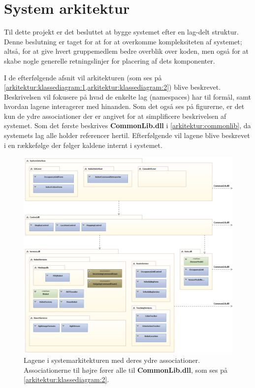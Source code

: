 \section{System arkitektur}\label{arkitektur}
Til dette projekt er det besluttet at bygge systemet efter en lag-delt struktur.
Denne beslutning er taget for at for at overkomme kompleksiteten af systemet; altså, for at give hvert gruppemedlem bedre overblik over koden, men også for at skabe nogle generelle retningslinjer for placering af dets komponenter.

I de efterfølgende afsnit vil arkitekturen (som ses på  \cref{arkitektur:klassediagram:1,arkitektur:klassediagram:2}) blive beskrevet.
Beskrivelsen vil fokusere på hvad de enkelte lag (namespaces) har til formål, samt hvordan lagene interagerer med hinanden.
Som det også ses på figurerne, er det kun de ydre associationer der er angivet for at simplificere beskrivelsen af systemet.
Som det første beskrives \textbf{CommonLib.dll} i \cref{arkitektur:commonlib}, da systemets lag alle holder referencer hertil.
Efterfølgende vil lagene blive beskrevet i en rækkefølge der følger kaldene internt i systemet.

\begin{figure}
\centering
\includegraphics[width=1\textwidth]{./graphics/systemarkitektur_1}
\caption{Lagene i systemarkitekturen med deres ydre associationer. Associationerne til højre fører alle til \textbf{CommonLib.dll}, som ses på \cref{arkitektur:klassediagram:2}.}
\label{arkitektur:klassediagram:1}
\end{figure}


